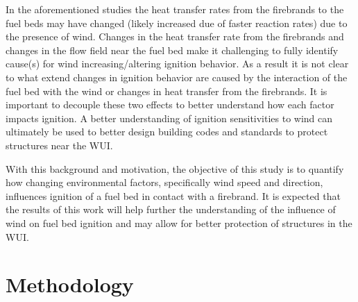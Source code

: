    In the aforementioned studies the heat transfer rates from the firebrands to the fuel beds may have changed (likely increased due of faster reaction rates) due to the presence of wind. Changes in the heat transfer rate from the firebrands and changes in the flow field near the fuel bed make it challenging to fully identify cause(s) for wind increasing/altering ignition behavior.
    As a result it is not clear to what extend changes in ignition behavior are caused by the interaction of the fuel bed with the wind or changes in heat transfer from the firebrands.
    It is important to decouple these two effects to better understand how each factor impacts ignition. A better understanding of ignition sensitivities to wind can ultimately be used to better design building codes and standards to protect structures near the WUI.

    
    
    
    
    With this background and motivation, the objective of this study is to quantify how changing environmental factors, specifically wind speed and direction, influences ignition of a fuel bed in contact with a firebrand. It is expected that the results of this work will help further the understanding of the influence of wind on fuel bed ignition and may allow for better protection of structures in the WUI.

\section{Methodology}
\label{sec:methods2}
